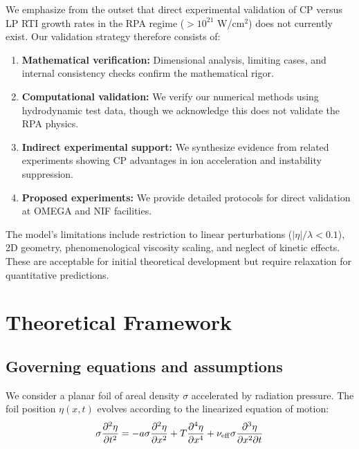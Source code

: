 \documentclass[aps,pre,twocolumn,showpacs,superscriptaddress]{revtex4-2}
\theoremstyle{definition}
\begin{document}
We emphasize from the outset that direct experimental validation of CP versus LP RTI growth rates in the RPA regime (\(>10^{21}\) W/cm\(^2\)) does not currently exist. Our validation strategy therefore consists of:

\begin{enumerate}
\item \textbf{Mathematical verification:} Dimensional analysis, limiting cases, and internal consistency checks confirm the mathematical rigor.

\item \textbf{Computational validation:} We verify our numerical methods using hydrodynamic test data, though we acknowledge this does not validate the RPA physics.

\item \textbf{Indirect experimental support:} We synthesize evidence from related experiments showing CP advantages in ion acceleration and instability suppression.

\item \textbf{Proposed experiments:} We provide detailed protocols for direct validation at OMEGA and NIF facilities.
\end{enumerate}

The model's limitations include restriction to linear perturbations ($|\eta|/\lambda < 0.1$), 2D geometry, phenomenological viscosity scaling, and neglect of kinetic effects. These are acceptable for initial theoretical development but require relaxation for quantitative predictions.

\section{Theoretical Framework}\label{sec:theory}

\subsection{Governing equations and assumptions}

We consider a planar foil of areal density $\sigma$ accelerated by radiation pressure. The foil position $\eta(x,t)$ evolves according to the linearized equation of motion:
\begin{equation}
\sigma\frac{\partial^2\eta}{\partial t^2} = -a\sigma\frac{\partial^2\eta}{\partial x^2} + T\frac{\partial^4\eta}{\partial x^4} + \nu_{\rm eff}\sigma\frac{\partial^3\eta}{\partial x^2\partial t}
\end{equation}
\end{document}
